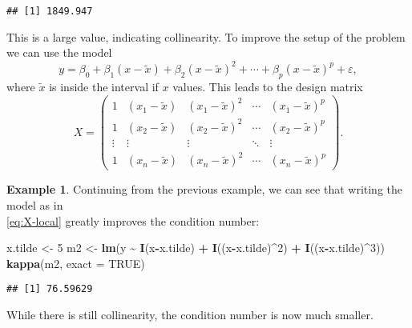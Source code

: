\documentclass[
  a4paper,
]{article}
\newenvironment{Shaded}{\begin{snugshade}}{\end{snugshade}}
\newcommand{\AttributeTok}[1]{\textcolor[rgb]{0.13,0.29,0.53}{#1}}
\newcommand{\ConstantTok}[1]{\textcolor[rgb]{0.56,0.35,0.01}{#1}}
\newcommand{\DecValTok}[1]{\textcolor[rgb]{0.00,0.00,0.81}{#1}}
\newcommand{\FunctionTok}[1]{\textcolor[rgb]{0.13,0.29,0.53}{\textbf{#1}}}
\newcommand{\NormalTok}[1]{#1}
\newcommand{\OtherTok}[1]{\textcolor[rgb]{0.56,0.35,0.01}{#1}}
\newcommand{\SpecialCharTok}[1]{\textcolor[rgb]{0.81,0.36,0.00}{\textbf{#1}}}
\theoremstyle{definition}
\theoremstyle{definition}
\newtheorem{example}{Example}[section]
\theoremstyle{definition}
\theoremstyle{definition}
\theoremstyle{remark}
\begin{document}
\begin{verbatim}
## [1] 1849.947
\end{verbatim}

This is a large value, indicating collinearity. To improve the setup
of the problem we can use the model
\begin{equation*}
  y
  = \beta_0 + \beta_1 (x - \tilde x) + \beta_2 (x - \tilde x)^2 + \cdots + \beta_p (x - \tilde x)^p + \varepsilon,
\end{equation*}
where \(\tilde x\) is inside the interval if \(x\) values.
This leads to the design matrix
\begin{equation}
  X
  = \begin{pmatrix}
      1 & (x_1-\tilde x) & (x_1-\tilde x)^2 & \cdots & (x_1-\tilde x)^p \\
      1 & (x_2-\tilde x) & (x_2-\tilde x)^2 & \cdots & (x_2-\tilde x)^p \\
      \vdots & \vdots & \vdots & \ddots & \vdots \\
      1 & (x_n-\tilde x) & (x_n-\tilde x)^2 & \cdots & (x_n-\tilde x)^p
    \end{pmatrix}.  \label{eq:X-local}
\end{equation}

\begin{example}
Continuing from the previous example, we can see that writing the model as in\\
\eqref{eq:X-local} greatly improves the condition number:

\begin{Shaded}
\begin{Highlighting}[]
\NormalTok{x.tilde }\OtherTok{\textless{}{-}} \DecValTok{5}
\NormalTok{m2 }\OtherTok{\textless{}{-}} \FunctionTok{lm}\NormalTok{(y }\SpecialCharTok{\textasciitilde{}} \FunctionTok{I}\NormalTok{(x}\SpecialCharTok{{-}}\NormalTok{x.tilde) }\SpecialCharTok{+} \FunctionTok{I}\NormalTok{((x}\SpecialCharTok{{-}}\NormalTok{x.tilde)}\SpecialCharTok{\^{}}\DecValTok{2}\NormalTok{) }\SpecialCharTok{+} \FunctionTok{I}\NormalTok{((x}\SpecialCharTok{{-}}\NormalTok{x.tilde)}\SpecialCharTok{\^{}}\DecValTok{3}\NormalTok{))}
\FunctionTok{kappa}\NormalTok{(m2, }\AttributeTok{exact =} \ConstantTok{TRUE}\NormalTok{)}
\end{Highlighting}
\end{Shaded}

\begin{verbatim}
## [1] 76.59629
\end{verbatim}

While there is still collinearity, the condition number is now much smaller.
\end{example}
\end{document}
